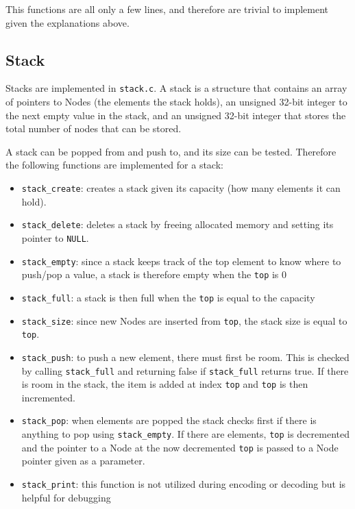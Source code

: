 \documentclass[12pt]{article}
\def\code#1{\texttt{#1}} %
\begin{document}
This functions are all only a few lines, and therefore are trivial to implement
given the explanations above.

\subsection{Stack}

Stacks are implemented in \code{stack.c}. A stack is a structure that contains an
array of pointers to Nodes (the elements the stack holds), an unsigned 32-bit integer
to the next empty value in the stack, and an unsigned 32-bit integer that stores the
total number of nodes that can be stored.

A stack can be popped from and push to, and its size can be tested. Therefore the 
following functions are implemented for a stack:

\begin{itemize}
	\item{\code{stack\_create}: creates a stack given its capacity (how many elements it can
		hold).}
	\item{\code{stack\_delete}: deletes a stack by freeing allocated memory and setting its 
		pointer to \code{NULL}.}
	\item{\code{stack\_empty}: since a stack keeps track of the top element to know where to
		push/pop a value, a stack is therefore empty when the \code{top} is 0}
	\item{\code{stack\_full}: a stack is then full when the \code{top} is equal to the capacity}
	\item{\code{stack\_size}: since new Nodes are inserted from \code{top}, the stack size
		is equal to \code{top}.}
	\item{\code{stack\_push}: to push a new element, there must first be room. This is checked
			by calling \code{stack\_full} and returning false if \code{stack\_full} returns true.
			If there is room in the stack, the item is added at index \code{top} and \code{top} is
		then incremented.}
	\item{\code{stack\_pop}: when elements are popped the stack checks first if there is
			anything to pop using \code{stack\_empty}. If there are elements, \code{top} is
			decremented and the pointer to a Node at the now decremented \code{top} is passed
		to a Node pointer given as a parameter.} 
	\item{\code{stack\_print}: this function is not utilized during encoding or decoding
		but is helpful for debugging}
\end{itemize}
\end{document}
